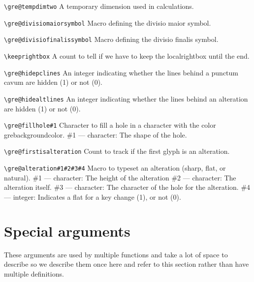 \verb=\gre@tempdimtwo=
	A temporary dimension used in calculations.

\verb=\gre@divisiomaiorsymbol=%
	Macro defining the divisio maior symbol.

\verb=\gre@divisiofinalissymbol=%
	Macro defining the divisio finalis symbol.

\verb=\keeprightbox=%
	A count to tell if we have to keep the localrightbox until the end.

\verb=\gre@hidepclines=%
	An integer indicating whether the lines behind a punctum cavum are hidden (1) or not (0).

\verb=\gre@hidealtlines=%
	An integer indicating whether the lines behind an alteration are hidden (1) or not (0).

\verb=\gre@fillhole#1=%
	Character to fill a hole in a character with the color grebackgroundcolor.
	\#1 --- character: The shape of the hole.

\verb=\gre@firstisalteration=%
	Count to track if the first glyph is an alteration.

\verb=\gre@alteration#1#2#3#4=%
	Macro to typeset an alteration (sharp, flat, or natural).
	\#1 --- character: The height of the alteration
	\#2 --- character: The alteration itself.
	\#3 --- character: The character of the hole for the alteration.
	\#4 --- integer: Indicates a flat for a key change (1), or not (0).

\section{Special arguments}

These arguments are used by multiple functions and take a lot of space to describe so we describe them once here and refer to this section rather than have multiple definitions.

